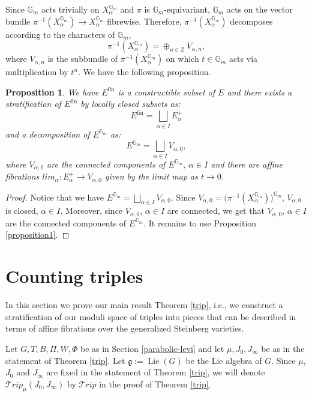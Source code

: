 \documentclass{amsart}
\newcommand{\gm}{\mathbb{G}_{m}}
\theoremstyle{plain}
\newtheorem{proposition}{Proposition}[section]
\theoremstyle{definition}
\theoremstyle{remark}
\DeclareMathOperator{\lie}{Lie}
\DeclareMathOperator{\fin}{fin}
\begin{document}
Since $\gm$ acts trivially on $X_{\alpha}^{\gm}$ and $\pi$ is $\gm$-equivariant, $\gm$ acts on the vector bundle $\pi^{-1}(X_{\alpha}^{\gm})\rightarrow X_{\alpha}^{\gm}$
fibrewise. Therefore, 
$\pi^{-1}(X_{\alpha}^{\gm})$ decomposes according to the characters of $\gm$, 
\[
\pi^{-1}(X_{\alpha}^{\gm})=\oplus_{n\in \mathbb{Z}}V_{\alpha,n},
\]
where $V_{\alpha,n}$ is the subbundle of $\pi^{-1}(X_{\alpha}^{\gm})$ on which $t\in\gm$ acts 
via multiplication by $t^n$. We have the following proposition.
\begin{proposition}\label{stratification of bundle}
We have $E^{\fin}$ is a constructible subset of $E$ and there exists a stratification of $E^{\fin}$ by locally closed subsets as:
\[
E^{\fin}=\displaystyle\bigsqcup_{\alpha\in I}E^{+}_{\alpha}
\]
and a decomposition of $E^{\gm}$ as:
\[
E^{\gm}=\bigsqcup_{\alpha\in I}V_{\alpha,0},
\]
where $V_{\alpha,0}$ are the connected components of $E^{\gm}$, $\alpha\in I$ %
and there are affine fibrations $lim_{\alpha}:E_{\alpha}^{+}\rightarrow V_{\alpha,0}$ given by the limit map as $t\to 0$.
\end{proposition}
\begin{proof}
Notice that we have
$
E^{\gm}=\bigsqcup_{\alpha\in I}V_{\alpha,0}.
$
Since $V_{\alpha,0}=\big(\pi^{-1}(X_{\alpha}^{\gm})\big)^{\gm}$, $V_{\alpha,0}$ is closed, $\alpha\in I$. Moreover, since %
$V_{\alpha,0}$, $\alpha\in I$ are connected, we get that $V_{\alpha,0}$, $\alpha\in I$ are the connected components of $E^{\gm}$. 
It remains to use Proposition \ref{proposition1}.
\end{proof}
\section{Counting triples}\label{formula}
In this section we prove our main result Theorem \ref{trip}, i.e., we construct a stratification of our moduli space of triples into pieces that can be described in terms of affine fibrations over the generalized Steinberg varieties. %

Let $G,T,B,\Pi,W,\Phi$ be as in Section \ref{parabolic-levi} and let $\mu,J_{0},J_{\infty}$ be as in the statement of Theorem \ref{trip}. Let $\mathfrak{g}:=\lie(G)$ be the Lie algebra of $G$. 
Since $\mu$, $J_{0}$ and $J_{\infty}$ are fixed in the statement of Theorem \ref{trip}, we will denote $\mathcal{T}rip_{\mu}(J_{0},J_{\infty})$ by $\mathcal{T}rip$ in the proof of Theorem \ref{trip}.
\end{document}
